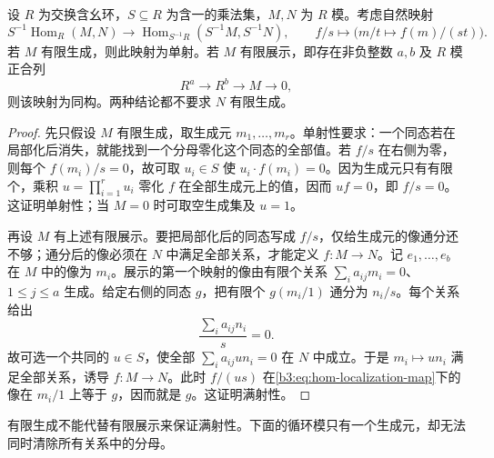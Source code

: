 \begin{theorem}\label{b3:thm:hom-localization}
	设 \(R\) 为交换含幺环，\(S\subseteq R\) 为含一的乘法集，\(M,N\) 为 \(R\) 模。考虑自然映射
	\[
		S^{-1}\operatorname{Hom}_R(M,N)\longrightarrow \operatorname{Hom}_{S^{-1}R}(S^{-1}M,S^{-1}N),\qquad f/s\longmapsto\bigl(m/t\longmapsto f(m)/(st)\bigr).
	\]
	若 \(M\) 有限生成，则此映射为单射。若 \(M\) 有限展示，即存在非负整数 \(a,b\) 及 \(R\) 模正合列
	\[
		R^a\longrightarrow R^b\longrightarrow M\longrightarrow0,
	\]
	则该映射为同构。两种结论都不要求 \(N\) 有限生成。
\end{theorem}
\begin{proof}
	先只假设 \(M\) 有限生成，取生成元 \(m_1,\ldots,m_r\)。单射性要求：一个同态若在局部化后消失，就能找到一个分母零化这个同态的全部值。若 \(f/s\) 在右侧为零，则每个 \(f(m_i)/s=0\)，故可取 \(u_i\in S\) 使 \(u_i\cdot f(m_i)=0\)。因为生成元只有有限个，乘积 \(u=\prod_{i=1}^r u_i\) 零化 \(f\) 在全部生成元上的值，因而 \(uf=0\)，即 \(f/s=0\)。这证明单射性；当 \(M=0\) 时可取空生成集及 \(u=1\)。

	再设 \(M\) 有上述有限展示。要把局部化后的同态写成 \(f/s\)，仅给生成元的像通分还不够；通分后的像必须在 \(N\) 中满足全部关系，才能定义 \(f:M\to N\)。记 \(e_1,\ldots,e_b\) 在 \(M\) 中的像为 \(m_i\)。展示的第一个映射的像由有限个关系 \(\sum_i a_{ij}m_i=0\)、\(1\le j\le a\) 生成。给定右侧的同态 \(g\)，把有限个 \(g(m_i/1)\) 通分为 \(n_i/s\)。每个关系给出
	\[
		\frac{\sum_i a_{ij}n_i}{s}=0.
	\]
	故可选一个共同的 \(u\in S\)，使全部 \(\sum_i a_{ij}u n_i=0\) 在 \(N\) 中成立。于是 \(m_i\mapsto u n_i\) 满足全部关系，诱导 \(f:M\rightarrow N\)。此时 \(f/(us)\) 在\eqref{b3:eq:hom-localization-map}下的像在 \(m_i/1\) 上等于 \(g\)，因而就是 \(g\)。这证明满射性。
\end{proof}

有限生成不能代替有限展示来保证满射性。下面的循环模只有一个生成元，却无法同时清除所有关系中的分母。

